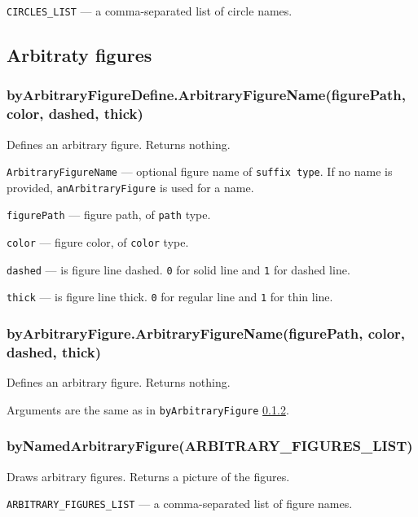 \documentclass{ltxdoc}
\begin{document}
	\texttt{CIRCLES\_LIST} — a comma-separated list of circle names.

\subsection{Arbitraty figures}

\subsubsection{byArbitraryFigureDefine.ArbitraryFigureName(figurePath, color, dashed, thick)}\label{byArbitraryFigureDefine}
	
	Defines an arbitrary figure. Returns nothing.
	
	\texttt{ArbitraryFigureName} — optional figure name of \texttt{suffix type}. If no name is provided, \texttt{anArbitraryFigure} is used for a name.
	
	\texttt{figurePath} — figure path, of \texttt{path} type.
	
	\texttt{color} — figure color, of \texttt{color} type.
	
	\texttt{dashed} — is figure line dashed. \texttt{0} for solid line and \texttt{1} for dashed line.
	
	\texttt{thick} — is figure line thick. \texttt{0} for regular line and \texttt{1} for thin line.

\subsubsection{byArbitraryFigure.ArbitraryFigureName(figurePath, color, dashed, thick)}\label{byArbitraryFigure}

	Defines an arbitrary figure. Returns nothing.
	
	Arguments are the same as in \texttt{byArbitraryFigure} \ref{byArbitraryFigure}.

\subsubsection{byNamedArbitraryFigure(ARBITRARY\_FIGURES\_LIST)}\label{byNamedArbitraryFigure}

	Draws arbitrary figures. Returns a picture of the figures.
	
	\texttt{ARBITRARY\_FIGURES\_LIST} — a comma-separated list of figure names.

\end{document}
